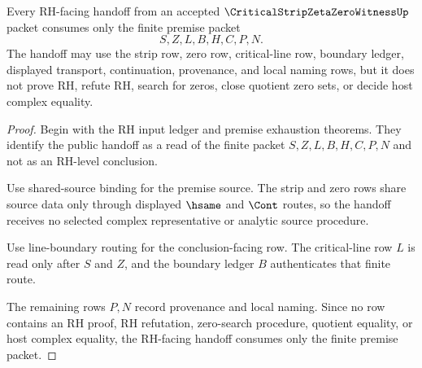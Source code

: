 \begin{theorem}
\label{thm:critical-strip-zeta-zero-rh-handoff-obligation}
Every RH-facing handoff from an accepted $\CriticalStripZetaZeroWitnessUp$ packet consumes only the finite premise packet
$$
S,Z,L,B,H,C,P,N.
$$
The handoff may use the strip row, zero row, critical-line row, boundary ledger, displayed transport, continuation, provenance, and local naming rows, but it does not prove RH, refute RH, search for zeros, close quotient zero sets, or decide host complex equality.
\end{theorem}
\begin{proof}
Begin with the RH input ledger and premise exhaustion theorems. They identify the public handoff as a read of the finite packet $S,Z,L,B,H,C,P,N$ and not as an RH-level conclusion.

Use shared-source binding for the premise source. The strip and zero rows share source data only through displayed $\hsame$ and $\Cont$ routes, so the handoff receives no selected complex representative or analytic source procedure.

Use line-boundary routing for the conclusion-facing row. The critical-line row $L$ is read only after $S$ and $Z$, and the boundary ledger $B$ authenticates that finite route.

The remaining rows $P,N$ record provenance and local naming. Since no row contains an RH proof, RH refutation, zero-search procedure, quotient equality, or host complex equality, the RH-facing handoff consumes only the finite premise packet.
\end{proof}

